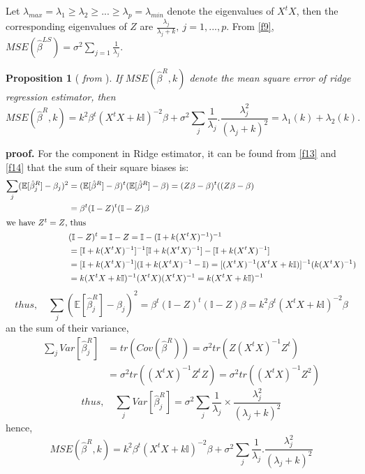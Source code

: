 \documentclass[12pt]{report}
\newtheorem {proposition}{Proposition}[section]  %
\begin{document}
	
	Let $\lambda_{max} = \lambda_{1} \geq \lambda_{2} \geq...\geq \lambda_{p}=\lambda_{min}$ denote the eigenvalues of $X^{t}X$, then the corresponding eigenvalues of $Z$ are $\frac{\lambda_{j}}{\lambda_{j} + k},\ j=1,...,p$. From \eqref{f9}, $MSE(\hat{\beta}^{LS})=\sigma^{2}\sum_{j=1}\frac{1}{\lambda_{j}}$.
	\begin{proposition}[ \textit{from \cite{text}}]
		If $MSE(\hat{\beta}^{R},k)$ denote the mean square error of ridge regression estimator, then 
		\begin{equation}
			MSE(\hat{\beta}^{R},k)=k^{2}\beta^{t}(X^{t}X+k\mathbb{I})^{-2}\beta +\sigma^{2}\sum_{j}\frac{1}{\lambda_{j}} .	\frac{\lambda_{j}^{2}}{(\lambda_{j}+k)^{2}}=\lambda_{1}(k)+\lambda_{2}(k).
			\label{f17}
		\end{equation}
	\end{proposition}
	\textbf{proof.}
	{\selectfont  For the component in Ridge estimator, it can be found from \eqref{f13} and \eqref{f14} that the sum of their square biases is:\begin{align*}
			\sum_{j}	(\mathbb{E}[\hat{\beta}^{R}_{j}]-\beta_{j})^{2} &= (\mathbb{E}[\hat{\beta}^{R}]-\beta)^{t}(\mathbb{E}[\hat{\beta}^{R}]-\beta)=(Z\beta-\beta)^{t}((Z\beta-\beta)\\
			&= \beta^{t}(\mathbb{I}-Z)^{t}(\mathbb{I}-Z)\beta \\
			\intertext{we have $Z^{t}=Z$, thus }
			&(\mathbb{I}-Z)^{t}=\mathbb{I}-Z=\mathbb{I}-(\mathbb{I}+k(X^{t}X)^{-1})^{-1}\\
			& = [\mathbb{I}+k(X^{t}X)^{-1}]^{-1}[\mathbb{I}+k(X^{t}X)^{-1}]-[\mathbb{I}+k(X^{t}X)^{-1}]\\
			&=[\mathbb{I}+k(X^{t}X)^{-1}](\mathbb{I} +k(X^{t}X)^{-1}-\mathbb{I})=[(X^{t}X)^{-1}(X^{t}X+k\mathbb{I})]^{-1}(k(X^{t}X)^{-1})\\
			&=k(X^{t}X+k\mathbb{I})^{-1}(X^{t}X)(X^{t}X)^{-1}=k(X^{t}X+k\mathbb{I})^{-1}
		\end{align*}
		\begin{equation}
			thus,\quad 	\sum_{j}	(\mathbb{E}[\hat{\beta}^{R}_{j}]-\beta_{j})^{2}=\beta^{t}(\mathbb{I}-Z)^{t}(\mathbb{I}-Z)\beta=k^{2}\beta^{t}(X^{t}X+k\mathbb{I})^{-2}\beta
			\label{f15}
		\end{equation}
		an the sum of their variance,
		\begin{align*}
			\sum_{j} Var[\hat{\beta}^{R}_{j}]&= tr(Cov(\hat{\beta}^{R}))=\sigma^{2}tr(Z(X^{t}X)^{-1}Z^{t})\\
			&=\sigma^{2}tr((X^{t}X)^{-1}Z^{t}Z)=\sigma^{2}tr((X^{t}X)^{-1}Z^{2})
		\end{align*}
		\begin{equation}
			thus,\quad 	\sum_{j}Var[\hat{\beta}^{R}_{j}]=\sigma^{2}\sum_{j}\frac{1}{\lambda_{j}} \times 	\frac{\lambda_{j}^{2}}{(\lambda_{j}+k)^{2}}
			\label{f16}
		\end{equation}
		hence,
		$$MSE(\hat{\beta}^{R},k)=k^{2}\beta^{t}(X^{t}X+k\mathbb{I})^{-2}\beta +\sigma^{2}\sum_{j}\frac{1}{\lambda_{j}} .	\frac{\lambda_{j}^{2}}{(\lambda_{j}+k)^{2}}$$}
	
\end{document}
